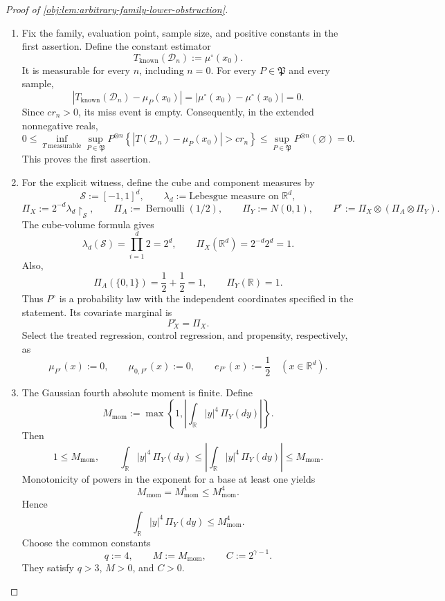 \begin{proof}[Proof of \cref{obj:lem:arbitrary-family-lower-obstruction}]
\begin{enumerate}
\item Fix the family, evaluation point, sample size, and positive constants in the first assertion. Define the constant estimator
\[
T_{\mathrm{known}}(\mathcal D_n):=\mu^\circ(x_0).
\]
It is measurable for every \(n\), including \(n=0\). For every \(P\in\mathfrak P\) and every sample,
\[
\left|T_{\mathrm{known}}(\mathcal D_n)-\mu_P(x_0)\right|
=\left|\mu^\circ(x_0)-\mu^\circ(x_0)\right|=0.
\]
Since \(c r_n>0\), its miss event is empty. Consequently, in the extended nonnegative reals,
\[
0\le
\inf_{T\ \mathrm{measurable}}\sup_{P\in\mathfrak P}
P^{\otimes n}\!\left\{
|T(\mathcal D_n)-\mu_P(x_0)|>c r_n
\right\}
\le
\sup_{P\in\mathfrak P}P^{\otimes n}(\varnothing)
=0.
\]
This proves the first assertion. %

\item For the explicit witness, define the cube and component measures by
\[
\mathcal S:=[-1,1]^d,\qquad
\lambda_d:=\text{Lebesgue measure on }\mathbb R^d,
\]
\[
\Pi_X:=2^{-d}\lambda_d\!\restriction_{\mathcal S},
\qquad
\Pi_A:=\operatorname{Bernoulli}(1/2),
\qquad
\Pi_Y:=N(0,1),
\qquad
P^\circ:=\Pi_X\otimes(\Pi_A\otimes\Pi_Y).
\]
The cube-volume formula gives
\[
\lambda_d(\mathcal S)=\prod_{i=1}^d 2=2^d,
\qquad
\Pi_X(\mathbb R^d)=2^{-d}2^d=1.
\]
Also,
\[
\Pi_A(\{0,1\})=\frac12+\frac12=1,
\qquad
\Pi_Y(\mathbb R)=1.
\]
Thus \(P^\circ\) is a probability law with the independent coordinates specified in the statement. Its covariate marginal is
\[
P_X^\circ=\Pi_X.
\]
Select the treated regression, control regression, and propensity, respectively, as
\[
\mu_{P^\circ}(x):=0,\qquad
\mu_{0,P^\circ}(x):=0,\qquad
e_{P^\circ}(x):=\frac12
\quad (x\in\mathbb R^d).
\]

\item The Gaussian fourth absolute moment is finite. Define
\[
M_{\mathrm{mom}}
:=
\max\left\{
1,\left|\int_{\mathbb R}|y|^4\,\Pi_Y(dy)\right|
\right\}.
\]
Then
\[
1\le M_{\mathrm{mom}},
\qquad
\int_{\mathbb R}|y|^4\,\Pi_Y(dy)
\le
\left|\int_{\mathbb R}|y|^4\,\Pi_Y(dy)\right|
\le M_{\mathrm{mom}}.
\]
Monotonicity of powers in the exponent for a base at least one yields
\[
M_{\mathrm{mom}}
=M_{\mathrm{mom}}^1
\le M_{\mathrm{mom}}^4.
\]
Hence
\[
\int_{\mathbb R}|y|^4\,\Pi_Y(dy)
\le M_{\mathrm{mom}}^4.
\]
Choose the common constants
\[
q:=4,\qquad M:=M_{\mathrm{mom}},\qquad C:=2^{\gamma-1}.
\]
They satisfy \(q>3\), \(M>0\), and \(C>0\). %


\end{enumerate}
\end{proof}
